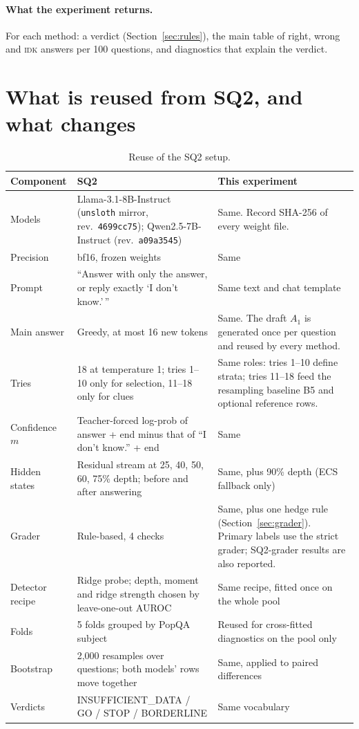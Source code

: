 \documentclass[11pt]{article}
\newcommand{\IDK}{\textsc{idk}}
\begin{document}
\paragraph{What the experiment returns.} For each method: a verdict (Section~\ref{sec:rules}), the main
table of right, wrong and \IDK{} answers per 100 questions, and diagnostics that explain the verdict.

\section{What is reused from SQ2, and what changes}

\begin{table}[H]
\centering
\small
\begin{tabularx}{\textwidth}{@{}lLL@{}}
\toprule
Component & SQ2 & This experiment \\
\midrule
Models & Llama-3.1-8B-Instruct (\texttt{unsloth} mirror, rev.\ \texttt{4699cc75}); Qwen2.5-7B-Instruct
         (rev.\ \texttt{a09a3545}) & Same. Record SHA-256 of every weight file. \\
Precision & bf16, frozen weights & Same \\
Prompt & ``Answer with only the answer, or reply exactly `I don't know.'\,'' & Same text and chat template \\
Main answer & Greedy, at most 16 new tokens & Same. The draft $A_1$ is generated once per question and
         reused by every method. \\
Tries & 18 at temperature 1; tries 1--10 only for selection, 11--18 only for clues & Same roles: tries
         1--10 define strata; tries 11--18 feed the resampling baseline B5 and optional reference rows. \\
Confidence $m$ & Teacher-forced log-prob of answer + end minus that of ``I don't know.'' + end & Same \\
Hidden states & Residual stream at 25, 40, 50, 60, 75\% depth; before and after answering & Same, plus 90\%
         depth (ECS fallback only) \\
Grader & Rule-based, 4 checks & Same, plus one hedge rule (Section~\ref{sec:grader}). Primary labels use
         the strict grader; SQ2-grader results are also reported. \\
Detector recipe & Ridge probe; depth, moment and ridge strength chosen by leave-one-out AUROC & Same
         recipe, fitted once on the whole pool \\
Folds & 5 folds grouped by PopQA subject & Reused for cross-fitted diagnostics on the pool only \\
Bootstrap & 2,000 resamples over questions; both models' rows move together & Same, applied to paired
         differences \\
Verdicts & INSUFFICIENT\_DATA / GO / STOP / BORDERLINE & Same vocabulary \\
\bottomrule
\end{tabularx}
\caption{Reuse of the SQ2 setup.}
\end{table}
\end{document}
